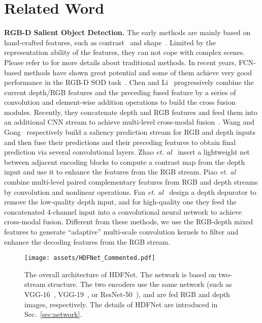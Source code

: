 \documentclass[runningheads]{llncs}
\begin{document}
\section{Related Word}

\noindent\textbf{RGB-D Salient Object Detection.} The early methods are mainly based on hand-crafted features, such as contrast~\cite{DES} and shape~\cite{LS}. Limited by the representation ability of the features, they can not cope with complex scenes. Please refer to \cite{SIP} for more details about traditional methods.
In recent years, FCN-based methods have shown great potential and some of them achieve very good performance in the RGB-D SOD task~\cite{CPFP,DUTRGBD,SIP}.
Chen and Li~\cite{PCANet} progressively combine the current depth/RGB features and the preceding fused feature by a series of convolution and element-wise addition operations to build the cross fusion modules.
Recently, they concatenate depth and RGB features and feed them into an additional CNN stream to achieve multi-level cross-modal fusion~\cite{TANet}.
Wang and Gong~\cite{AFNetRGBD} respectively build a saliency prediction stream for RGB and depth inputs and then fuse their predictions and their preceding features to obtain final prediction via several convolutional layers.
Zhao \emph{et. al}~\cite{CPFP} insert a lightweight net between adjacent encoding blocks to compute a contrast map from the depth input and use it to enhance the features from the RGB stream.
Piao \emph{et. al}~\cite{DUTRGBD} combine multi-level paired complementary features from RGB and depth streams by convolution and nonlinear operations.
Fan \emph{et. al}~\cite{SIP} design a depth depurator to remove the low-quality depth input, and for high-quality one they feed the concatenated 4-channel input into a convolutional neural network to achieve cross-modal fusion.
Different from these methods, we use the RGB-depth mixed features to generate ``adaptive'' multi-scale convolution kernels to filter and enhance the decoding features from the RGB stream.

\begin{figure}[t]
 \centering
 \texttt{[image: assets/HDFNet\_Commented.pdf]}
 \caption{The overall architecture of HDFNet. The network is based on two-stream structure. The two encoders use the same network (such as VGG-16~\cite{VGG}, VGG-19~\cite{VGG}, or ResNet-50~\cite{Resnet}), and are fed RGB and depth images, respectively. The details of HDFNet are introduced in Sec.~\ref{sec:network}.}
 \label{fig:HDFNet}
\end{figure}
\end{document}
